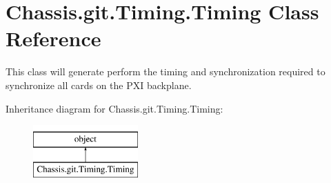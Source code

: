\hypertarget{class_chassis_8git_1_1_timing_1_1_timing}{\section{Chassis.\-git.\-Timing.\-Timing Class Reference}
\label{class_chassis_8git_1_1_timing_1_1_timing}
}


This class will generate perform the timing and synchronization required to synchronize all cards on the P\-X\-I backplane.  


Inheritance diagram for Chassis.\-git.\-Timing.\-Timing\-:\begin{figure}[H]
\begin{center}
\leavevmode
\includegraphics[height=2.000000cm]{class_chassis_8git_1_1_timing_1_1_timing}
\end{center}
\end{figure}
